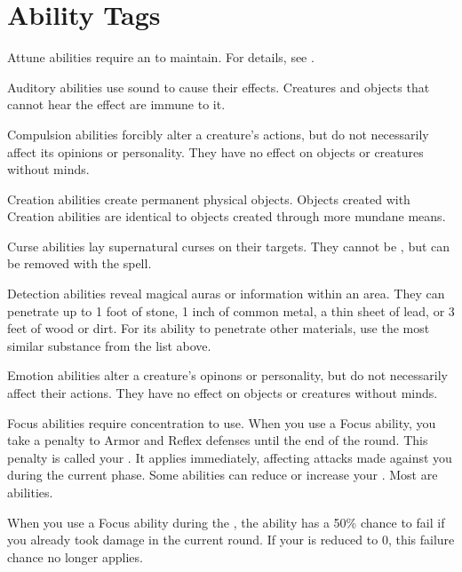 \newpage
\section{Ability Tags}\label{Ability Tags}

 Attune abilities require an  to maintain.
For details, see .

 Auditory abilities use sound to cause their effects.
Creatures and objects that cannot hear the effect are immune to it.

 Compulsion abilities forcibly alter a creature's actions, but do not necessarily affect its opinions or personality.
They have no effect on objects or creatures without minds.

 Creation abilities create permanent physical objects.
Objects created with Creation abilities are identical to objects created through more mundane means.

 Curse abilities lay supernatural curses on their targets.
They cannot be , but can be removed with the  spell.

\label{Detection} Detection abilities reveal magical auras or information within an area.
They can penetrate up to 1 foot of stone, 1 inch of common metal, a thin sheet of lead, or 3 feet of wood or dirt.
For its ability to penetrate other materials, use the most similar substance from the list above.

 Emotion abilities alter a creature's opinons or personality, but do not necessarily affect their actions.
They have no effect on objects or creatures without minds.

\label{Focus} Focus abilities require concentration to use.
When you use a Focus ability, you take a  penalty to Armor and Reflex defenses until the end of the round.
This penalty is called your .
It applies immediately, affecting attacks made against you during the current phase.
Some abilities can reduce or increase your .
Most  are  abilities.

When you use a Focus ability during the , the ability has a 50\% chance to fail if you already took damage in the current round.
If your  is reduced to 0, this failure chance no longer applies.


